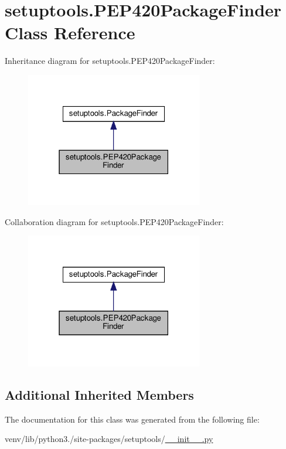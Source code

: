 \hypertarget{classsetuptools_1_1PEP420PackageFinder}{}\section{setuptools.\+P\+E\+P420\+Package\+Finder Class Reference}
\label{classsetuptools_1_1PEP420PackageFinder}


Inheritance diagram for setuptools.\+P\+E\+P420\+Package\+Finder\+:
\nopagebreak
\begin{figure}[H]
\begin{center}
\leavevmode
\includegraphics[width=219pt]{classsetuptools_1_1PEP420PackageFinder__inherit__graph}
\end{center}
\end{figure}


Collaboration diagram for setuptools.\+P\+E\+P420\+Package\+Finder\+:
\nopagebreak
\begin{figure}[H]
\begin{center}
\leavevmode
\includegraphics[width=219pt]{classsetuptools_1_1PEP420PackageFinder__coll__graph}
\end{center}
\end{figure}
\subsection*{Additional Inherited Members}


The documentation for this class was generated from the following file\+:\begin{DoxyCompactItemize}
\item 
venv/lib/python3./site-\/packages/setuptools/\hyperlink{venv_2lib_2python3_89_2site-packages_2setuptools_2____init_____8py}{\+\_\+\+\_\+init\+\_\+\+\_\+.\+py}\end{DoxyCompactItemize}
